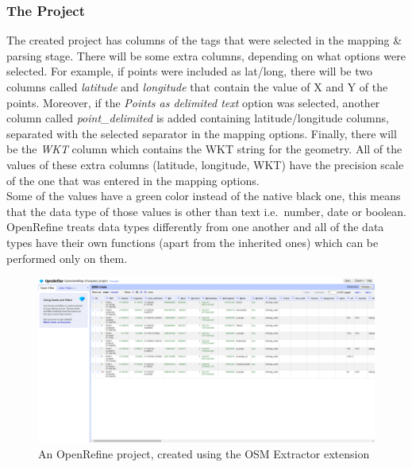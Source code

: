 \subsubsection{The Project}
The created project has columns of the tags that were selected in the mapping \& parsing stage. There will be some extra columns,
depending on what options were selected. For example, if points were included as lat/long, there will be two columns called \textit{latitude}
and \textit{longitude} that contain the value of X and Y of the points. Moreover, if the \textit{Points as delimited text} option was selected,
another column called \textit{point\_delimited} is added containing latitude/longitude columns, separated with
the selected separator in the mapping options. Finally, there will be the \textit{WKT} column which contains
the WKT string for the geometry. All of the values of these extra columns (latitude, longitude, WKT) have the precision scale of the one that was entered in
the mapping options.\\
\newline
Some of the values have a green color instead of the native black one, this means that the data type of those values is other
than text i.e.\ number, date or boolean.
OpenRefine treats data types differently from one another and all of the data types
have their own functions (apart from the inherited ones) which can be performed
only on them.\\
\begin{figure}[H]
    \includegraphics[width=\linewidth]{./Figures/OSM_Extractor/osm_extractor_project.png}
    \caption{An OpenRefine project, created using the OSM Extractor extension}
\end{figure}
